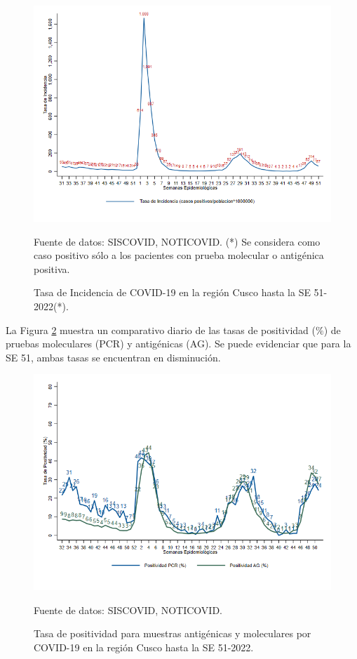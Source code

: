\documentclass[12pt,a4paper,openany]{book}
\begin{document}
	
	\begin{figure}[h]
		\caption{Tasa de Incidencia de COVID-19 en la región Cusco hasta la SE 51-2022(*).  }\label{fig:incidencia}
		\begin{center}
			\includegraphics[width=0.90\linewidth]{../figuras/tasa_incidencia_2021_2022.png}
		\end{center}
		{\footnotesize {Fuente de datos: SISCOVID, NOTICOVID. (*) Se considera como caso positivo sólo a los pacientes con prueba molecular o antigénica positiva.}}
	\end{figure}
	
	\pagebreak
	
	
	La Figura \ref{fig:total_muestras_procesada} muestra un comparativo diario de las tasas de positividad ($\%$) de pruebas moleculares (PCR) y antigénicas (AG). Se puede evidenciar que para la SE 51, ambas tasas se encuentran en disminución.
	
	\begin{figure}[h]
		\caption{Tasa de positividad para muestras antigénicas y moleculares por COVID-19 en la región Cusco hasta la SE 51-2022. }\label{fig:total_muestras_procesada}
		\begin{center}
			\includegraphics[width=0.80\linewidth]{../figuras/positividad_diaria_2021_2022.png}
		\end{center}
		{\footnotesize {Fuente de datos: SISCOVID, NOTICOVID.}}
	\end{figure}
	
\end{document}
